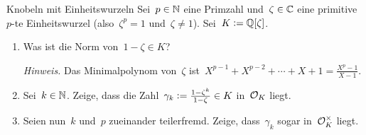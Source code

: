 \documentclass{uebblatt}
\begin{document}
\begin{aufgabe}{Knobeln mit Einheitswurzeln}
Sei~$p \in \mathbb{N}$ eine Primzahl und~$\zeta \in \mathbb{C}$ eine primitive~$p$-te
Einheitswurzel (also~$\zeta^p = 1$ und~$\zeta \neq 1$). Sei~$K \vcentcolon=
\mathbb{Q}[\zeta]$.
\begin{enumerate}
\item Was ist die Norm von~$1 - \zeta \in K$?
{\tiny\emph{Hinweis.} Das Minimalpolynom von~$\zeta$ ist~$X^{p-1} + X^{p-2} +
\cdots + X + 1 = \tfrac{X^p - 1}{X-1}$.\par}
\item Sei~$k \in \mathbb{N}$. Zeige, dass die Zahl~$\gamma_k \vcentcolon=
\tfrac{1-\zeta^k}{1-\zeta} \in K$ in~$\mathcal{O}_K$ liegt.
\item Seien nun~$k$ und~$p$ zueinander teilerfremd. Zeige, dass~$\gamma_k$
sogar in~$\mathcal{O}_K^\times$ liegt.
\end{enumerate}
\end{aufgabe}
\end{document}
